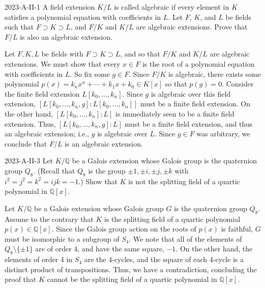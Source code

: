 \documentclass{article}
\begin{document}
	\begin{prb}{2023-A-II-1}
		A field extension $K/L$ is called algebraic if every element in $K$ satisfies a polynomial equation with coefficients in $L$. Let $F$, $K$, and $L$ be fields such that $F \supset K \supset L$, and $F/K$ and $K/L$ are algebraic extensions. Prove that $F/L$ is also an algebraic extension. 
	\end{prb}
	Let $F, K, L$ be fields with $F \supset K \supset L$, and so that $F/K$ and $K/L$ are algebraic extensions. We must show that every $x \in F$ is the root of a polynomial equation with coefficients in $L$. So fix some $g \in F$. Since $F/K$ is algebraic, there exists some polynomial $p(x) = k_{n}x^n + \dotsm + k_1x + k_0 \in K[x]$ so that $p(g) =0$. Consider the finite field extension $L[k_0, \ldots, k_n]$. Since $g$ is algebraic over this field extension, $[L[k_0, \ldots, k_n, g]: L[k_0, \ldots, k_n]]$ must be a finite field extension. On the other hand, $[L[k_0, \ldots, k_n]: L]$ is immediately seen to be a finite field extension. Thus, $[L[k_0, \ldots, k_n,g]:L]$ must be a finite field extension, and thus an algebraic extension; i.e., $g$ is algebraic over $L$. Since $g \in F$ was arbitrary, we conclude that $F/L$ is an algebraic extension. 
	
	\begin{prb}{2023-A-II-3}
		Let $K/\mathbb{Q}$ be a Galois extension whose Galois group is the quaternion group $Q_{8}$. (Recall that $Q_{8}$ is the group $\pm 1, \pm i, \pm j, \pm k$ with $i^{2} = j^{2} =k^{2} = ijk = -1$.) Show that $K$ is not the splitting field of a quartic polynomial in $\mathbb{Q}[x]$. 
	\end{prb}
	
	Let $K/\mathbb{Q}$ be a Galois extension whose Galois group $G$ is the quaternion group $Q_{8}$. Assume to the contrary that $K$ is the splitting field of a quartic polynomial $p(x) \in \mathbb{Q}[x]$. Since the Galois group action on the roots of $p(x)$ is faithful, $G$ must be isomorphic to a subgroup of $S_{4}$. We note that all of the elements of $Q_{8}\setminus \{\pm 1\}$ are of order 4, and have the same square, $-1$. On the other hand, the elements of order 4 in $S_{4}$ are the 4-cycles, and the square of each 4-cycle is a distinct product of transpositions. Thus, we have a contradiction, concluding the proof that $K$ cannot be the splitting field of a quartic polynomial in $\mathbb{Q}[x]$.  
	
\end{document}
